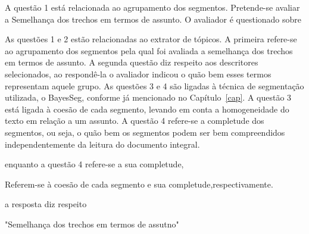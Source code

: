 
A questão 1 está relacionada ao agrupamento dos segmentos. Pretende-se avaliar a Semelhança dos trechos em termos de assunto. O avaliador é questionado sobre 

As questões 1 e 2 estão relacionadas ao extrator de tópicos. A primeira refere-se ao agrupamento dos segmentos pela qual foi avaliada a semelhança dos trechos em termos de assunto. A segunda questão diz respeito aos descritores selecionados, ao respondê-la o avaliador indicou o quão bem esses termos representam aquele grupo.
As questões 3 e 4 são ligadas à técnica de segmentação utilizada, o BayesSeg, conforme já mencionado no Capítulo~\ref{cap}. A questão 3 está ligada à coesão de cada segmento, levando em conta a homogeneidade do texto em relação a um assunto. A questão 4 refere-se a completude dos segmentos, ou seja, o quão bem os segmentos podem ser bem compreendidos independentemente da leitura do documento integral.



enquanto a questão 4 refere-se a sua completude, 

Referem-se à coesão de cada segmento e sua completude,respectivamente.


a resposta diz respeito









"Semelhança dos trechos em termos de assutno"

















